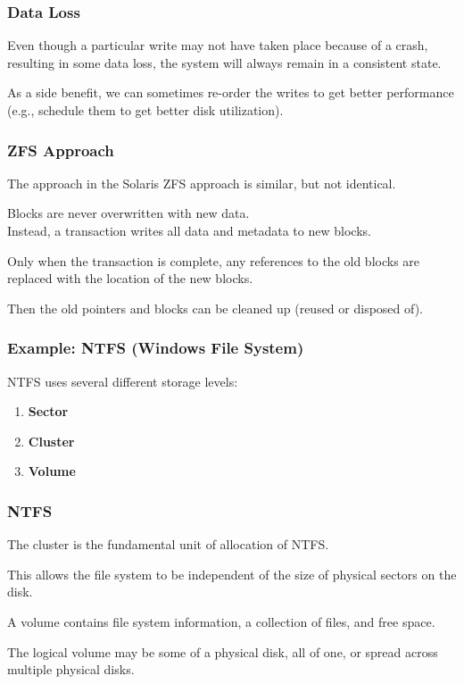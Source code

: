 \begin{frame}
\frametitle{Data Loss}

Even though a particular write may not have taken place because of a crash, resulting in some data loss, the system will always remain in a consistent state. 

As a side benefit, we can sometimes re-order the writes to get better performance (e.g., schedule them to get better disk utilization). 


\end{frame}

\begin{frame}
\frametitle{ZFS Approach}

The approach in the Solaris ZFS approach is similar, but not identical. 

Blocks are never overwritten with new data.\\
\quad Instead, a transaction writes all data and metadata to new blocks. 

Only when the transaction is complete, any references to the old blocks are replaced with the location of the new blocks. 


Then the old pointers and blocks can be cleaned up (reused or disposed of). 


\end{frame}



\begin{frame}
\frametitle{Example: NTFS (Windows File System)}

NTFS uses several different storage levels:

\begin{enumerate}
	\item \textbf{Sector}
	\item \textbf{Cluster}
	\item \textbf{Volume}
\end{enumerate}

\end{frame}

\begin{frame}
\frametitle{NTFS}

The cluster is the fundamental unit of allocation of NTFS.

This allows the file system to be independent of the size of physical sectors on the disk. 

A volume contains file system information, a collection of files, and free space. 

The logical volume may be some of a physical disk, all of one, or spread across multiple physical disks.

\end{frame}

